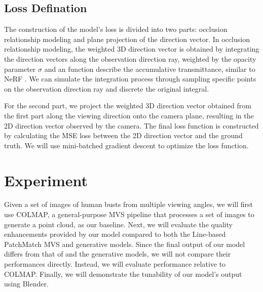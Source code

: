 \documentclass[12pt]{article}
\begin{document}
    \subsection{Loss Defination}
    
    The construction of the model's loss is divided into two parts: occlusion relationship modeling and plane projection of the direction vector. In occlusion relationship modeling, the weighted 3D direction vector is obtained by integrating the direction vectors along the observation direction ray, weighted by the opacity parameter $\sigma$ and an function describe the accumulative transmittance, similar to NeRF \cite{mildenhall_nerf_2020}. We can simulate the integration process through sampling specific points on the observation direction ray and discrete the original integral.

    For the second part, we project the weighted 3D direction vector obtained from the first part along the viewing direction onto the camera plane, resulting in the 2D direction vector observed by the camera. The final loss function is constructed by calculating the MSE loss between the 2D direction vector and the ground truth. We will use mini-batched gradient descent to optimize the loss function.
    
  \section{Experiment}

  Given a set of images of human busts from multiple viewing angles, we will first use COLMAP, a general-purpose MVS pipeline that processes a set of images to generate a point cloud, as our baseline. Next, we will evaluate the quality enhancements provided by our model compared to both the Line-based PatchMatch MVS \cite{nam_strand-accurate_nodate} and generative models. Since the final output of our model differs from that of \cite{nam_strand-accurate_nodate} and the generative models, we will not compare their performances directly. Instead, we will evaluate performance relative to COLMAP. Finally, we will demonstrate the tunability of our model's output using Blender.
  
  

  \printbibliography
\end{document}
